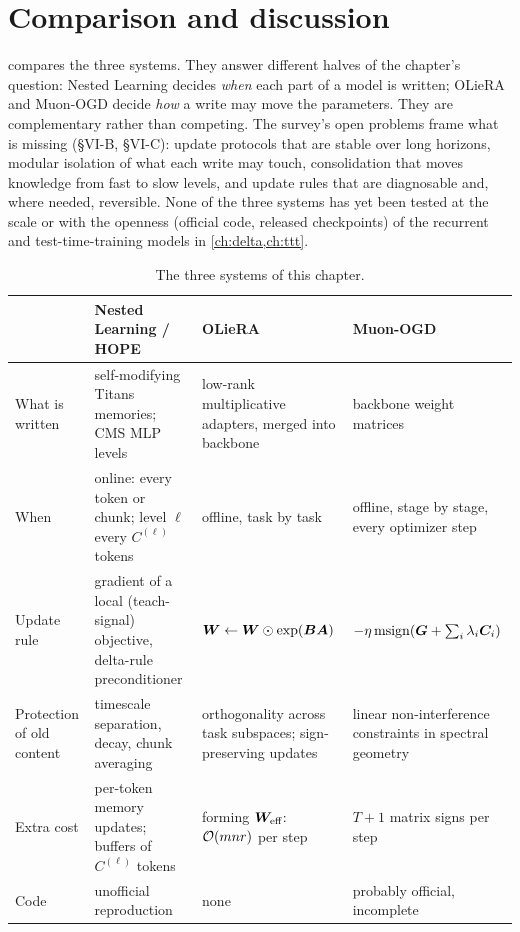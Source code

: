 \section{Comparison and discussion}\label{sec:c11-comparison}

 compares the three systems. They answer different halves of the chapter's
question: Nested Learning decides \emph{when} each part of a model is written; OLieRA and
Muon-OGD decide \emph{how} a write may move the parameters. They are complementary rather than
competing. The survey's open problems frame what is missing (\S VI-B, \S VI-C): update protocols
that are stable over long horizons, modular isolation of what each write may touch, consolidation
that moves knowledge from fast to slow levels, and update rules that are diagnosable and, where
needed, reversible. None of the three systems has yet been tested at the scale or with the
openness (official code, released checkpoints) of the recurrent and test-time-training models in
\cref{ch:delta,ch:ttt}.

\begin{table}[t]
\centering\small
\caption{The three systems of this chapter.}
\label{tab:c11-compare}
\begin{tabularx}{\textwidth}{@{}l>{\raggedright\arraybackslash}X>{\raggedright\arraybackslash}X>{\raggedright\arraybackslash}X@{}}
\toprule
 & Nested Learning / HOPE & OLieRA & Muon-OGD \\
\midrule
What is written & self-modifying Titans memories; CMS MLP levels & low-rank multiplicative adapters, merged into backbone & backbone weight matrices \\
When & online: every token or chunk; level $\ell$ every $C^{(\ell)}$ tokens & offline, task by task & offline, stage by stage, every optimizer step \\
Update rule & gradient of a local (teach-signal) objective, delta-rule preconditioner & $\bm{W} \leftarrow \bm{W}\odot\exp(\bm{B}\bm{A})$ & $-\eta\operatorname{msign}(\bm{G} + \sum_i\lambda_i\bm{C}_i)$ \\
Protection of old content & timescale separation, decay, chunk averaging & orthogonality across task subspaces; sign-preserving updates & linear non-interference constraints in spectral geometry \\
Extra cost & per-token memory updates; buffers of $C^{(\ell)}$ tokens & forming $\bm{W}_{\text{eff}}$: $\mathcal{O}(mnr)$ per step & $T+1$ matrix signs per step \\
Code & unofficial reproduction & none & probably official, incomplete \\
\bottomrule
\end{tabularx}
\end{table}

